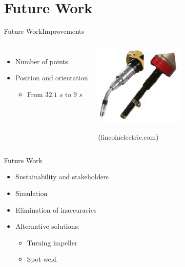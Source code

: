 \section{Future Work}
\begin{frame}{Future Work}{Improvements}
\begin{columns}
\begin{itemize}
    \item Number of points
    \item Position and orientation
    \begin{itemize}
        \item From $32.1$ $s$ to $9$ $s$
    \end{itemize}
\end{itemize}
\begin{center}
\includegraphics[width=0.815\textwidth]{graphics/jesper/pointer_n_weldgun}

\tiny{(lincolnelectric.com)}
\end{center}
\end{columns}
\end{frame}

\begin{frame}{Future Work}
\begin{itemize}
    \item Sustainability and stakeholders
    \item Simulation
    \item Elimination of inaccuracies
\vspace{4mm}
\item Alternative solutions:
\begin{itemize}
    \item Turning impeller
    \item Spot weld
\end{itemize}
\end{itemize}
\end{frame}

